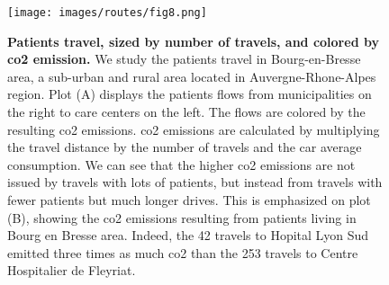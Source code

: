 \begin{figure}[H]
    \texttt{[image: images/routes/fig8.png]}
    \centering
    \caption{
        \textbf{Patients travel, sized by number of travels, and colored by \ac{co2} emission.} We study the patients travel in Bourg-en-Bresse area, a sub-urban and rural area located in Auvergne-Rhone-Alpes region. Plot (A) displays the patients flows from municipalities on the right to care centers on the left. The flows are colored by the resulting \ac{co2} emissions. \ac{co2} emissions are calculated by multiplying the travel distance by the number of travels and the car average consumption. We can see that the higher \ac{co2} emissions are not issued by travels with lots of patients, but instead from travels with fewer patients but much longer drives. This is emphasized on plot (B), showing the \ac{co2} emissions resulting from patients living in Bourg en Bresse area. Indeed, the 42 travels to Hopital Lyon Sud emitted three times as much \ac{co2} than the 253 travels to Centre Hospitalier de Fleyriat.
    }
    \label{fig:routes-co2-01}
\end{figure}
